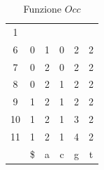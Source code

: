 \begin{esempio}
\begin{table}[!ht]
\begin{tabular}{cccccc}
            \multicolumn{1}{c|}{1}                            \\ \cline{2-6}
            \multicolumn{1}{c|}{\cellcolor[HTML]{EFEFEF}6}  &
            \multicolumn{1}{c|}{0}                          &
            \multicolumn{1}{c|}{1}                          &
            \multicolumn{1}{c|}{0}                          &
            \multicolumn{1}{c|}{2}                          &
            \multicolumn{1}{c|}{2}                            \\ \cline{2-6}
            \multicolumn{1}{c|}{\cellcolor[HTML]{EFEFEF}7}  &
            \multicolumn{1}{c|}{0}                          &
            \multicolumn{1}{c|}{2}                          &
            \multicolumn{1}{c|}{0}                          &
            \multicolumn{1}{c|}{2}                          &
            \multicolumn{1}{c|}{2}                            \\ \cline{2-6}
            \multicolumn{1}{c|}{\cellcolor[HTML]{EFEFEF}8}  &
            \multicolumn{1}{c|}{0}                          &
            \multicolumn{1}{c|}{2}                          &
            \multicolumn{1}{c|}{1}                          &
            \multicolumn{1}{c|}{2}                          &
            \multicolumn{1}{c|}{2}                            \\ \cline{2-6}
            \multicolumn{1}{c|}{\cellcolor[HTML]{EFEFEF}9}  &
            \multicolumn{1}{c|}{1}                          &
            \multicolumn{1}{c|}{2}                          &
            \multicolumn{1}{c|}{1}                          &
            \multicolumn{1}{c|}{2}                          &
            \multicolumn{1}{c|}{2}                            \\ \cline{2-6}
            \multicolumn{1}{c|}{\cellcolor[HTML]{EFEFEF}10} &
            \multicolumn{1}{c|}{1}                          &
            \multicolumn{1}{c|}{2}                          &
            \multicolumn{1}{c|}{1}                          &
            \multicolumn{1}{c|}{3}                          &
            \multicolumn{1}{c|}{2}                            \\ \cline{2-6}
            \multicolumn{1}{c|}{\cellcolor[HTML]{EFEFEF}11} &
            \multicolumn{1}{c|}{1}                          &
            \multicolumn{1}{c|}{2}                          &
            \multicolumn{1}{c|}{1}                          &
            \multicolumn{1}{c|}{4}                          &
            \multicolumn{1}{c|}{2}                            \\ \cline{2-6}
                                                            &
            \cellcolor[HTML]{EFEFEF}\$                      &
            \cellcolor[HTML]{EFEFEF}a                       &
            \cellcolor[HTML]{EFEFEF}c                       &
            \cellcolor[HTML]{EFEFEF}g                       &
            \cellcolor[HTML]{EFEFEF}t
        \end{tabular}
        \caption{Funzione $Occ$} \label{tab:esempioOcc}
    \end{table}


\end{esempio}
